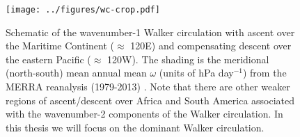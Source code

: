 \documentclass[letterpaper,12pt,titlepage,oneside,final]{book}
\begin{document}
\begin{figure}[H]
\centering
\noindent\texttt{[image: ../figures/wc-crop.pdf]}\hfill
\caption{\footnotesize Schematic of the wavenumber-1 Walker circulation with ascent over the Maritime Continent ($\approx$ 120E) and compensating descent over the eastern Pacific ($\approx$ 120W). The shading is the meridional (north-south) mean annual mean $\omega$ (units of hPa day$^{-1}$) from the MERRA reanalysis (1979-2013) \citep{rienecker_merra:_2011}. Note that there are other weaker regions of ascent/descent over Africa and South America associated with the wavenumber-2 components of the Walker circulation. In this thesis we will focus on the dominant Walker circulation.}
\label{fig:WC}
\end{figure}



\end{document}
